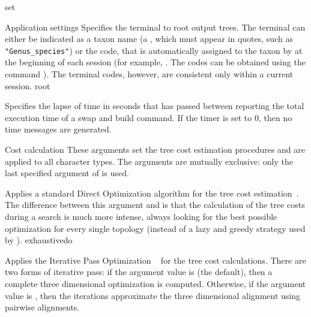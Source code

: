\begin{command}{set}{}
\begin{arguments}
\begin{argumentgroup}{Application settings}
{Specifies the terminal to root output trees.
The terminal can either be indicated as a taxon name (a
\poystring, which must appear in quotes, such as
\texttt{"Genus\_species"}) or the code, that is automatically
assigned to the taxon by \poy at the beginning of each \poy
session (for example, . The codes can
be obtained using the command ). The
terminal codes, however, are consistent only within a current
session.}
{root}

%            
{Specifies the lapse of time in seconds that has passed
between reporting the total execution time of a swap and build
command. If the timer is set to 0, then no time messages are
generated.}{}

\end{argumentgroup}

\begin{argumentgroup}{Cost calculation}
{These arguments set the tree cost estimation procedures and are
applied to all character types. The arguments are mutually
exclusive: only the last specified argument of  is
used.}

{Applies a standard Direct Optimization algorithm for the tree
cost estimation~\cite{wheeler1996,wheeler2002a}. The difference 
between this argument and  is
that the calculation of the tree costs during a search is much
more intense, always looking for the best possible optimization 
for every single topology (instead of a lazy and greedy strategy
used by ).}
{exhaustivedo}

{Applies the Iterative Pass Optimization ~\cite{wheeler2003a} for the tree cost
calculations. There are two forms of iterative pass: if the
argument value is  (the default), then 
a complete three dimensional optimization is computed. 
Otherwise, if the argument value is , then the iterations
approximate the three dimensional alignment using pairwise
alignments. 

}
\end{argumentgroup}
\end{arguments}
\end{command}
